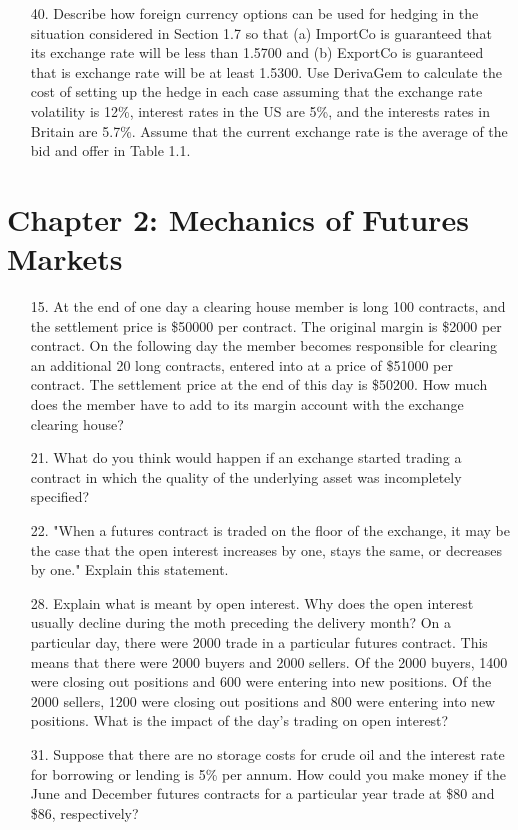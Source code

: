 \documentclass{article}
\begin{document}
\begin{itemize}
	\item[40.] Describe how foreign currency options can be used for hedging in the situation considered in Section 1.7 so that (a) ImportCo is guaranteed that its exchange rate will be less than 1.5700 and (b) ExportCo is guaranteed that is exchange rate will be at least 1.5300. Use DerivaGem to calculate the cost of setting up the hedge in each case assuming that the exchange rate volatility is 12\%, interest rates in the US are 5\%, and the interests rates in Britain are 5.7\%. Assume that the current exchange rate is the average of the bid and offer in Table 1.1.
		
\end{itemize}

\section*{Chapter 2: Mechanics of Futures Markets}

\begin{itemize}
	\item[15.] At the end of one day a clearing house member is long 100 contracts, and the settlement price is \$50000 per contract. The original margin is \$2000 per contract. On the following day the member becomes responsible for clearing an additional 20 long contracts, entered into at a price of \$51000 per contract. The settlement price at the end of this day is \$50200. How much does the member have to add to its margin account with the exchange clearing house?

	\item[21.] What do you think would happen if an exchange started trading a contract in which the quality of the underlying asset was incompletely specified?

	\item[22.] "When a futures contract is traded on the floor of the exchange, it may be the case that the open interest increases by one, stays the same, or decreases by one." Explain this statement.

	\item[28.] Explain what is meant by open interest. Why does the open interest usually decline during the moth preceding the delivery month? On a particular day, there were 2000 trade in a particular futures contract. This means that there were 2000 buyers and 2000 sellers. Of the 2000 buyers, 1400 were closing out positions and 600 were entering into new positions. Of the 2000 sellers, 1200 were closing out positions and 800 were entering into new positions. What is the impact of the day's trading on open interest?

	\item[31.] Suppose that there are no storage costs for crude oil and the interest rate for borrowing or lending is 5\% per annum. How could you make money if the June and December futures contracts for a particular year trade at \$80 and \$86, respectively?
		
\end{itemize}
\end{document}
